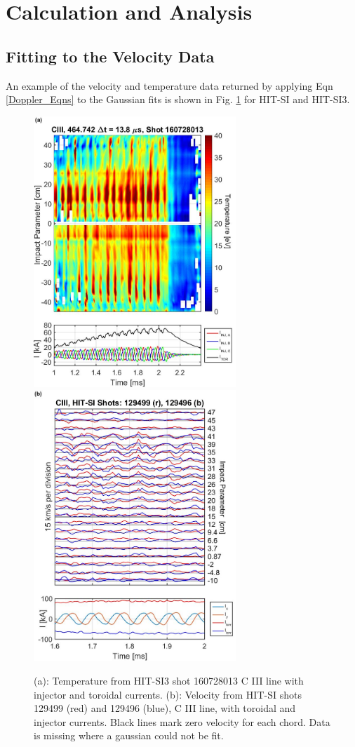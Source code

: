 \section{Calculation and Analysis}\label{sec::Analysis}
\subsection{Fitting to the Velocity Data}\label{sec::DataFit}
\hspace{4ex}An example of the velocity and temperature data returned by applying Eqn \ref{Doppler_Eqns} to the Gaussian fits is shown in Fig. \ref{Fig::Raw_VelTemp} for HIT-SI and HIT-SI3.
\begin{figure}
\includegraphics[width=3in]{160728013_Temp_1}\nolinebreak
\includegraphics[width=3in]{129499_Lines_5}\caption{(a): Temperature from HIT-SI3 shot 160728013 C III line with injector and toroidal currents. (b): Velocity from HIT-SI shots 129499 (red) and 129496 (blue), C III line, with toroidal and injector currents. Black lines mark zero velocity for each chord. Data is missing where a gaussian could not be fit.}\label{Fig::Raw_VelTemp}
\end{figure}
